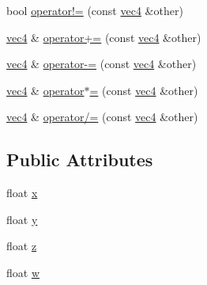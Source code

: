 \begin{DoxyCompactItemize}
bool \hyperlink{structu__engine_1_1maths_1_1vec4_a5fca11dcf7d26779a77848a1a008fd81}{operator!=} (const \hyperlink{structu__engine_1_1maths_1_1vec4}{vec4} \&other)
\item 
\hyperlink{structu__engine_1_1maths_1_1vec4}{vec4} \& \hyperlink{structu__engine_1_1maths_1_1vec4_afa920101db70f2d003a6bcb82cf6e0c4}{operator+=} (const \hyperlink{structu__engine_1_1maths_1_1vec4}{vec4} \&other)
\item 
\hyperlink{structu__engine_1_1maths_1_1vec4}{vec4} \& \hyperlink{structu__engine_1_1maths_1_1vec4_a83ad242c72ee1bf57378b3375f467076}{operator-\/=} (const \hyperlink{structu__engine_1_1maths_1_1vec4}{vec4} \&other)
\item 
\hyperlink{structu__engine_1_1maths_1_1vec4}{vec4} \& \hyperlink{structu__engine_1_1maths_1_1vec4_a45fe9c9271ba22c5fdf60985ba95cce9}{operator$\ast$=} (const \hyperlink{structu__engine_1_1maths_1_1vec4}{vec4} \&other)
\item 
\hyperlink{structu__engine_1_1maths_1_1vec4}{vec4} \& \hyperlink{structu__engine_1_1maths_1_1vec4_acd51e1193766532515ecda949d1eace1}{operator/=} (const \hyperlink{structu__engine_1_1maths_1_1vec4}{vec4} \&other)
\end{DoxyCompactItemize}
\subsection*{Public Attributes}
\begin{DoxyCompactItemize}
\item 
float \hyperlink{structu__engine_1_1maths_1_1vec4_a7b942a2b3961a50f279a67f56dc5e74d}{x}
\item 
float \hyperlink{structu__engine_1_1maths_1_1vec4_a6a927f4b26273d6edafc9dd1ae2ee6ff}{y}
\item 
float \hyperlink{structu__engine_1_1maths_1_1vec4_aa4ee395d64d387a30ec6e46a6413c3a1}{z}
\item 
float \hyperlink{structu__engine_1_1maths_1_1vec4_a5bcce6d958d948707fec88887b05d7b6}{w}
\end{DoxyCompactItemize}

